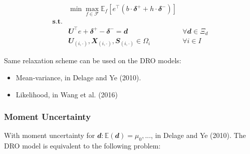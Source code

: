 \documentclass[
  a4paper,
,tablecaptionabove
]{scrartcl}
\numberwithin{equation}{section}
\providecommand{\tightlist}{%
  \setlength{\itemsep}{0pt}\setlength{\parskip}{0pt}}
\begin{document}
\[\begin{aligned}
                  & \min \max_{f\in \mathscr F}\mathbb E_f  \left[e^\top( b \cdot\mathbfit{\delta^+}  + h\cdot \mathbfit \delta^-)\right]                                 \\
    \mathbf{s.t.} &                                                                                                                                                       \\
                  & \mathbfit{U} ^\top e + \mathbfit \delta^+ - \mathbfit \delta^-  = \mathbfit d                                         & \forall \mathbfit d \in \Xi_d \\
                  & \mathbfit U_{(i,\cdot)}, \mathbfit X_{(i,\cdot)}, \mathbfit S_{(i,\cdot)} \in \Omega_i                                & \forall i\in I
  \end{aligned}\]

Same relaxation scheme can be used on the DRO models:

\begin{itemize}
  \tightlist
  \item
        Mean-variance, in Delage and Ye (2010).
  \item
        Likelihood, in Wang et al. (2016)
\end{itemize}

\hypertarget{moment-uncertainty}{%
  \subsubsection{Moment Uncertainty}\label{moment-uncertainty}}

With moment uncertainty for
\(\mathbfit d: \mathbb{E}(\mathbfit d) = \mu_0, ...\), in Delage and
Ye (2010). The DRO model is equivalent to the following problem:
\end{document}
